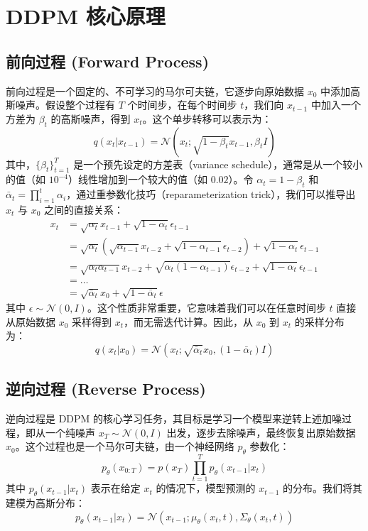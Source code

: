 \documentclass{ctexart}
\begin{document}
\section{DDPM 核心原理}

\subsection{前向过程 (Forward Process)}
\noindent
前向过程是一个固定的、不可学习的马尔可夫链，它逐步向原始数据 $x_0$ 中添加高斯噪声。假设整个过程有 $T$ 个时间步，在每个时间步 $t$，我们向 $x_{t-1}$ 中加入一个方差为 $\beta_t$ 的高斯噪声，得到 $x_t$。这个单步转移可以表示为：
$$ q(x_t | x_{t-1}) = \mathcal{N}(x_t; \sqrt{1 - \beta_t} x_{t-1}, \beta_t I) $$
其中，$\{\beta_t\}_{t=1}^T$ 是一个预先设定的方差表（variance schedule），通常是从一个较小的值（如 $10^{-4}$）线性增加到一个较大的值（如 $0.02$）。令 $\alpha_t = 1 - \beta_t$ 和 $\bar{\alpha}_t = \prod_{i=1}^{t} \alpha_i$，通过重参数化技巧（reparameterization trick），我们可以推导出 $x_t$ 与 $x_0$ 之间的直接关系：
\begin{align*}
    x_t &= \sqrt{\alpha_t}x_{t-1} + \sqrt{1-\alpha_t}\epsilon_{t-1} \\
    &= \sqrt{\alpha_t}(\sqrt{\alpha_{t-1}}x_{t-2} + \sqrt{1-\alpha_{t-1}}\epsilon_{t-2}) + \sqrt{1-\alpha_t}\epsilon_{t-1} \\
    &= \sqrt{\alpha_t\alpha_{t-1}}x_{t-2} + \sqrt{\alpha_t(1-\alpha_{t-1})}\epsilon_{t-2} + \sqrt{1-\alpha_t}\epsilon_{t-1} \\
    &= \dots \\
    &= \sqrt{\bar{\alpha}_t}x_0 + \sqrt{1 - \bar{\alpha}_t}\epsilon
\end{align*}
其中 $\epsilon \sim \mathcal{N}(0, I)$。这个性质非常重要，它意味着我们可以在任意时间步 $t$ 直接从原始数据 $x_0$ 采样得到 $x_t$，而无需迭代计算。因此，从 $x_0$ 到 $x_t$ 的采样分布为：
$$ q(x_t | x_0) = \mathcal{N}(x_t; \sqrt{\bar{\alpha}_t} x_0, (1 - \bar{\alpha}_t) I) $$


\subsection{逆向过程 (Reverse Process)}
\noindent
逆向过程是 DDPM 的核心学习任务，其目标是学习一个模型来逆转上述加噪过程，即从一个纯噪声 $x_T \sim \mathcal{N}(0, I)$ 出发，逐步去除噪声，最终恢复出原始数据 $x_0$。这个过程也是一个马尔可夫链，由一个神经网络 $p_\theta$ 参数化：
$$ p_\theta(x_{0:T}) = p(x_T) \prod_{t=1}^T p_\theta(x_{t-1} | x_t) $$
其中 $p_\theta(x_{t-1} | x_t)$ 表示在给定 $x_t$ 的情况下，模型预测的 $x_{t-1}$ 的分布。我们将其建模为高斯分布：
$$ p_\theta(x_{t-1} | x_t) = \mathcal{N}(x_{t-1}; \mu_\theta(x_t, t), \Sigma_\theta(x_t, t)) $$
\end{document}
